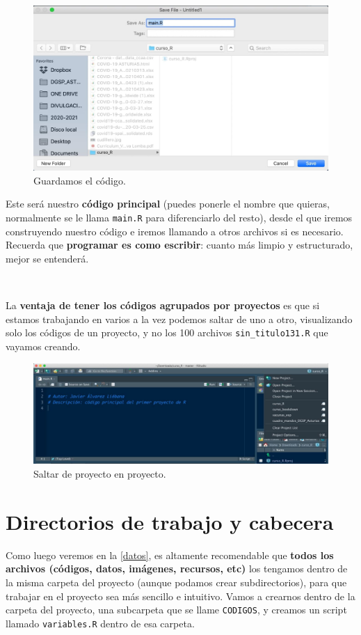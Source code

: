 \documentclass[11pt,]{book}
\begin{document}
\begin{figure}

{\centering \includegraphics[width=0.5\linewidth]{./img/crear_proyecto8} 

}

\caption{Guardamos el código.}\label{fig:crear-proyecto8}
\end{figure}

Este será nuestro \textbf{código principal} (puedes ponerle el nombre que quieras, normalmente se le llama \texttt{main.R} para diferenciarlo del resto), desde el que iremos construyendo nuestro código e iremos llamando a otros archivos si es necesario. Recuerda que \textbf{programar es como escribir}: cuanto más limpio y estructurado, mejor se entenderá.

~

La \textbf{ventaja de tener los códigos agrupados por proyectos} es que si estamos trabajando en varios a la vez podemos saltar de uno a otro, visualizando solo los códigos de un proyecto, y no los 100 archivos \texttt{sin\_titulo131.R} que vayamos creando.

\begin{figure}

{\centering \includegraphics[width=0.5\linewidth]{./img/crear_proyecto9} 

}

\caption{Saltar de proyecto en proyecto.}\label{fig:crear-proyecto9}
\end{figure}

\hypertarget{directorios-de-trabajo-y-cabecera}{%
\section{Directorios de trabajo y cabecera}\label{directorios-de-trabajo-y-cabecera}}

Como luego veremos en la \ref{datos}, es altamente recomendable que \textbf{todos los archivos (códigos, datos, imágenes, recursos, etc)} los tengamos dentro de la misma carpeta del proyecto (aunque podamos crear subdirectorios), para que trabajar en el proyecto sea más sencillo e intuitivo. Vamos a crearnos dentro de la carpeta del proyecto, una subcarpeta que se llame \texttt{CODIGOS}, y creamos un script llamado \texttt{variables.R} dentro de esa carpeta.
\end{document}
